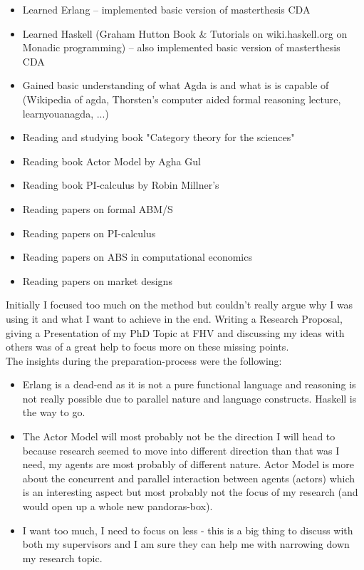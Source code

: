 \begin{itemize}
\item Learned Erlang – implemented basic version of masterthesis CDA
\item Learned Haskell (Graham Hutton Book \& Tutorials on wiki.haskell.org on Monadic programming) – also implemented basic version of masterthesis CDA
\item Gained basic understanding of what Agda is and what is is capable of (Wikipedia of agda, Thorsten’s computer aided formal reasoning lecture, learnyouanagda, ...)
\item Reading and studying book "Category theory for the sciences"
\item Reading book Actor Model by Agha Gul
\item Reading book PI-calculus by Robin Millner’s
\item Reading papers on formal ABM/S
\item Reading papers on PI-calculus
\item Reading papers on ABS in computational economics
\item Reading papers on market designs
\end{itemize}

Initially I focused too much on the method but couldn't really argue why I was using it and what I want to achieve in the end. Writing a Research Proposal, giving a Presentation of my PhD Topic at FHV and discussing my ideas with others was of a great help to focus more on these missing points. \\

The insights during the preparation-process were the following:

\begin{itemize}
\item Erlang is a dead-end as it is not a pure functional language and reasoning is not really possible due to parallel nature and language constructs. Haskell is the way to go.
\item The Actor Model will most probably not be the direction I will head to because research seemed to move into different direction than that was I need, my agents are most probably of different nature. Actor Model is more about the concurrent and parallel interaction between agents (actors) which is an interesting aspect but most probably not the focus of my research (and would open up a whole new pandoras-box).
\item I want too much, I need to focus on less - this is a big thing to discuss with both my supervisors and I am sure they can help me with narrowing down my research topic.
\end{itemize}

